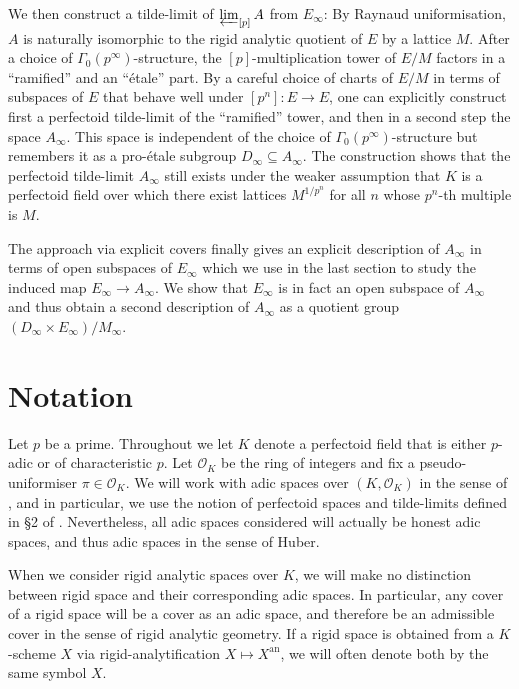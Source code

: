 \documentclass[10pt,oneside]{amsart}
\theoremstyle{definition}
\theoremstyle{remark}
\begin{document}
We then construct a tilde-limit of $\varprojlim_{[p]} A$ from $E_\infty$: By Raynaud uniformisation, $A$ is naturally isomorphic to the rigid analytic quotient of $E$ by a lattice $M$. After a choice of $\Gamma_0(p^\infty)$-structure, the $[p]$-multiplication tower of $E/M$ factors in a ``ramified'' and an ``\'etale'' part. By a careful choice of charts of $E/M$ in terms of subspaces of $E$ that behave well under $[p^n]:E\rightarrow E$, one can explicitly construct first a perfectoid tilde-limit of the ``ramified'' tower, and then in a second step the space $A_\infty$. This space is independent of the choice of $\Gamma_0(p^\infty)$-structure but remembers it as a pro-\'etale subgroup $D_\infty \subseteq A_\infty$. The construction shows that the perfectoid tilde-limit $A_\infty$ still exists under the weaker assumption that $K$ is a perfectoid field over which there exist lattices $M^{1/p^n}$ for all $n$ whose $p^n$-th multiple is $M$.

The approach via explicit covers finally gives an explicit description of $A_\infty$ in terms of open subspaces of $E_\infty$ which we use in the last section to study the induced map $E_\infty\rightarrow A_\infty$. We show that $E_\infty$ is in fact an open subspace of $A_\infty$ and thus obtain a second description of $A_\infty$ as a quotient group $(D_\infty\times E_\infty)/M_\infty$.


\section*{Notation}
	Let $p$ be a prime.
	Throughout we let $K$ denote a perfectoid field that is either $p$-adic or of characteristic $p$. Let $\mathcal O_K$ be the ring of integers and fix a pseudo-uniformiser $\pi\in \mathcal O_K$.
	We will work with adic spaces over $(K,\mathcal O_K)$ in the sense of \cite{SW}, and in particular, we use the notion of perfectoid spaces and tilde-limits defined in \S2 of \cite{SW}. Nevertheless, all adic spaces considered will actually be honest adic spaces, and thus adic spaces in the sense of Huber.
	
	When we consider rigid analytic spaces over $K$, we will make no distinction between rigid space and their corresponding adic spaces.
	In particular, any cover of a rigid space will be a cover as an adic space, and therefore be an admissible cover in the sense of rigid analytic geometry. If a rigid space is obtained from a $K$-scheme $X$ via rigid-analytification $X\mapsto X^{\operatorname{an}}$, we will often denote both by the same symbol $X$.
\end{document}
